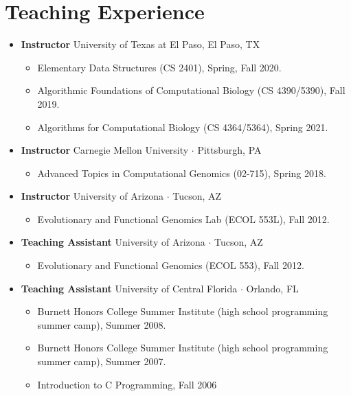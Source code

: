 \documentclass[10pt,letterpaper]{article}
\newcommand{\bigdot}{$\cdot$\xspace}
\begin{document}
\section*{Teaching Experience}
\begin{itemize}[leftmargin=*,labelindent=5pt,itemindent=-15pt]
\item \textbf{Instructor}  University of Texas at El Paso, El Paso, TX
\begin{itemize}
	\item Elementary Data Structures (CS 2401), Spring, Fall 2020.
	\item Algorithmic Foundations of Computational Biology (CS 4390/5390), Fall 2019.
	\item Algorithms for Computational Biology (CS 4364/5364), Spring 2021.
\end{itemize}

\item \textbf{Instructor}  Carnegie Mellon University \bigdot Pittsburgh, PA
\begin{itemize}
    \item Advanced Topics in Computational Genomics (02-715), Spring 2018.
\end{itemize}

\item \textbf{Instructor} University of Arizona \bigdot Tucson, AZ
\begin{itemize}
    \item Evolutionary and Functional Genomics Lab (ECOL 553L), Fall 2012.
\end{itemize}

\item \textbf{Teaching Assistant}
University of Arizona \bigdot Tucson, AZ
\begin{itemize}
    \item Evolutionary and Functional Genomics (ECOL 553), Fall 2012.
\end{itemize}

\item \textbf{Teaching Assistant}
University of Central Florida \bigdot Orlando, FL
\begin{itemize}
    \item Burnett Honors College Summer Institute (high school programming summer camp), Summer 2008.
    \item Burnett Honors College Summer Institute (high school programming summer camp), Summer 2007.
    \item Introduction to C Programming, Fall 2006
\end{itemize}
\end{itemize}
\end{document}
